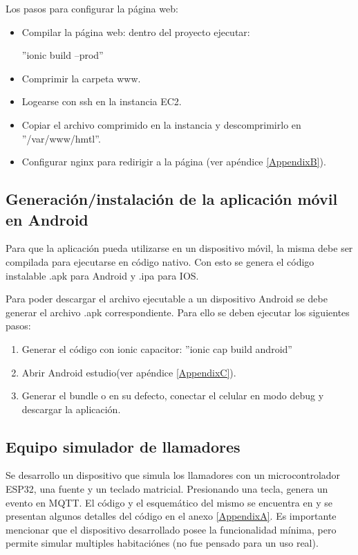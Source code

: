 Los pasos para configurar la página web:
\begin{itemize}
\item Compilar la página web: dentro del proyecto ejecutar:

''ionic build --prod''
\item Comprimir la carpeta www.
\item Logearse con ssh en la instancia EC2.
\item Copiar el archivo comprimido en la instancia y descomprimirlo en ''/var/www/hmtl''.
\item Configurar nginx para redirigir a la página (ver apéndice \ref{AppendixB}).

\end{itemize}

\subsection{Generación/instalación de la aplicación móvil en Android}

Para que la aplicación pueda utilizarse en un dispositivo móvil, la misma debe ser compilada para ejecutarse en código nativo. Con esto se genera el código instalable .apk para Android y .ipa para IOS. 

Para poder descargar el archivo ejecutable a un dispositivo Android se debe generar el archivo .apk correspondiente. Para ello se deben ejecutar los siguientes pasos:

\begin{enumerate}

\item Generar el código con ionic capacitor:
''ionic cap build android''
\item Abrir Android estudio(ver apéndice \ref{AppendixC}).
\item Generar el bundle o en su defecto, conectar el celular en modo debug y descargar la aplicación. 
\end{enumerate}
\pagebreak


\subsection{Equipo simulador de llamadores}

Se desarrollo un dispositivo que simula los llamadores con un microcontrolador ESP32, una fuente y un teclado matricial. Presionando una tecla, genera un evento en MQTT. El código y el esquemático del mismo se encuentra en \citep{WEBSITE:33} y se presentan algunos detalles del código en el anexo \ref{AppendixA}. Es importante mencionar que el dispositivo desarrollado posee la funcionalidad mínima, pero permite simular multiples habitaciónes (no fue pensado para un uso real).

